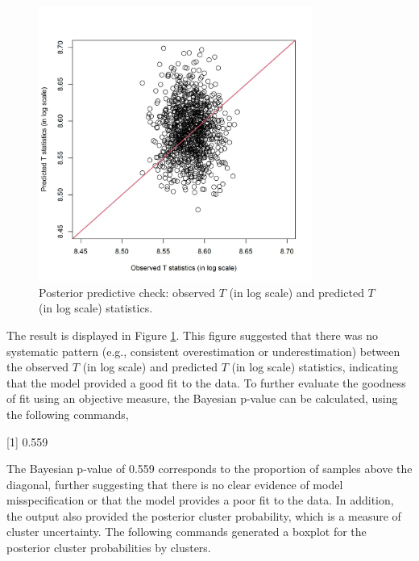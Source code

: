 \begin{figure}[h]
\centering
\includegraphics[width=9cm,height=9cm]{./Figures/posterior_check.JPEG}
\caption{\label{fig:posterior_check}  Posterior predictive check: observed $T$ (in log scale) and predicted $T$ (in log scale) statistics.}
\end{figure}

The result is displayed in Figure \ref{fig:posterior_check}. This figure suggested that there was no systematic pattern (e.g., consistent overestimation or underestimation) between the observed $T$ (in log scale) and predicted $T$ (in log scale) statistics, indicating that the model provided a good fit to the data. To further evaluate the goodness of fit using an objective measure, the Bayesian p-value can be calculated, using the following commands,


\begin{example}

[1] 0.559

\end{example}

The Bayesian p-value of 0.559 corresponds to the proportion of samples above the diagonal, further suggesting that there is no clear evidence of model misspecification or that the model provides a poor fit to the data. In addition, the output also provided the posterior cluster probability, which is a measure of cluster uncertainty. The following commands generated a boxplot for the posterior cluster probabilities by clusters. 

